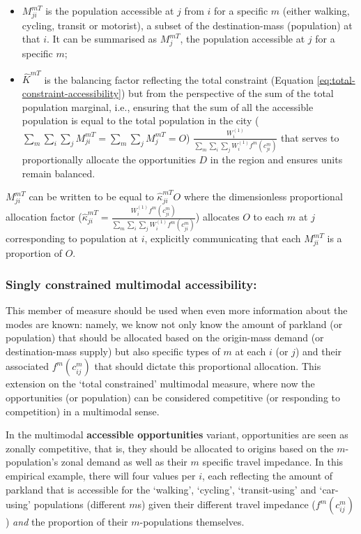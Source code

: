 \documentclass[
11pt, %
oneside, %
english, %
singlespacing, %
]{macthesis} %
\def\tightlist{}
\begin{document}
\begin{itemize}
\tightlist
\item
  \(M^{mT}_{ji}\) is the population accessible at \(j\) from \(i\) for a specific \(m\) (either walking, cycling, transit or motorist), a subset of the destination-mass (population) at that \(i\). It can be summarised as \(M^{mT}_{j}\), the population accessible at \(j\) for a specific \(m\);
\item
  \(\hat K^{mT}\) is the balancing factor reflecting the total constraint (Equation \ref{eq:total-constraint-accessibility}) but from the perspective of the sum of the total population marginal, i.e., ensuring that the sum of all the accessible population is equal to the total population in the city (\(\sum_m \sum_i\sum_j M^{mT}_{ji} = \sum_m \sum_j M^{mT}_{j} = O\)) \(\frac{W^{(1)}_i}{\sum_m\sum_i\sum_j W^{(1)}_if^m(c^m_{ji})}\) that serves to proportionally allocate the opportunities \(D\) in the region and ensures units remain balanced.
\end{itemize}

\(M_{ji}^{mT}\) can be written to be equal to \(\hat \kappa_{ji}^{mT} O\) where the dimensionless proportional allocation factor (\(\hat \kappa_{ji}^{mT} = \frac{W_i^{(1)} f^m(c^m_{ji})}{\sum_m\sum_i\sum_j W^{(1)}_if^m(c^m_{ji})}\)) allocates \(O\) to each \(m\) at \(j\) corresponding to population at \(i\), explicitly communicating that each \(M_{ji}^{mT}\) is a proportion of \(O\).

\subsubsection{Singly constrained multimodal accessibility:}\label{singly-constrained-multimodal-accessibility}

This member of measure should be used when even more information about the modes are known: namely, we know not only know the amount of parkland (or population) that should be allocated based on the origin-mass demand (or destination-mass supply) but also specific types of \(m\) at each \(i\) (or \(j\)) and their associated \(f^m(c^m_{ij})\) that should dictate this proportional allocation. This extension on the `total constrained' multimodal measure, where now the opportunities (or population) can be considered competitive (or responding to competition) in a multimodal sense.

In the multimodal \textbf{accessible opportunities} variant, opportunities are seen as zonally competitive, that is, they should be allocated to origins based on the \(m\)-population's zonal demand as well as their \(m\) specific travel impedance. In this empirical example, there will four values per \(i\), each reflecting the amount of parkland that is accessible for the `walking', `cycling', `transit-using' and `car-using' populations (different \(m\)s) given their different travel impedance (\(f^m(c^m_{ij})\)) \emph{and} the proportion of their \(m\)-populations themselves.
\end{document}

